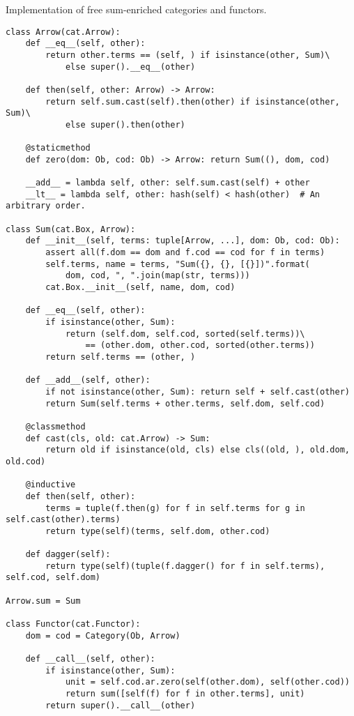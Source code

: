 \begin{python}
{\normalfont Implementation of free sum-enriched categories and functors.}

\begin{verbatim}
class Arrow(cat.Arrow):
    def __eq__(self, other):
        return other.terms == (self, ) if isinstance(other, Sum)\
            else super().__eq__(other)

    def then(self, other: Arrow) -> Arrow:
        return self.sum.cast(self).then(other) if isinstance(other, Sum)\
            else super().then(other)

    @staticmethod
    def zero(dom: Ob, cod: Ob) -> Arrow: return Sum((), dom, cod)

    __add__ = lambda self, other: self.sum.cast(self) + other
    __lt__ = lambda self, other: hash(self) < hash(other)  # An arbitrary order.

class Sum(cat.Box, Arrow):
    def __init__(self, terms: tuple[Arrow, ...], dom: Ob, cod: Ob):
        assert all(f.dom == dom and f.cod == cod for f in terms)
        self.terms, name = terms, "Sum({}, {}, [{}])".format(
            dom, cod, ", ".join(map(str, terms)))
        cat.Box.__init__(self, name, dom, cod)

    def __eq__(self, other):
        if isinstance(other, Sum):
            return (self.dom, self.cod, sorted(self.terms))\
                == (other.dom, other.cod, sorted(other.terms))
        return self.terms == (other, )

    def __add__(self, other):
        if not isinstance(other, Sum): return self + self.cast(other)
        return Sum(self.terms + other.terms, self.dom, self.cod)

    @classmethod
    def cast(cls, old: cat.Arrow) -> Sum:
        return old if isinstance(old, cls) else cls((old, ), old.dom, old.cod)

    @inductive
    def then(self, other):
        terms = tuple(f.then(g) for f in self.terms for g in self.cast(other).terms)
        return type(self)(terms, self.dom, other.cod)

    def dagger(self):
        return type(self)(tuple(f.dagger() for f in self.terms), self.cod, self.dom)

Arrow.sum = Sum

class Functor(cat.Functor):
    dom = cod = Category(Ob, Arrow)

    def __call__(self, other):
        if isinstance(other, Sum):
            unit = self.cod.ar.zero(self(other.dom), self(other.cod))
            return sum([self(f) for f in other.terms], unit)
        return super().__call__(other)
\end{verbatim}
\end{python}


